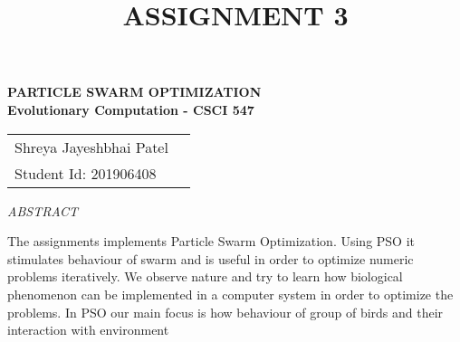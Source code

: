 \documentclass{article}
\title{ASSIGNMENT 3}
\begin{document}
\maketitle
\begin{center}
\Large \textbf{PARTICLE SWARM OPTIMIZATION}
\\[5pt]
\centering
\small {\bf Evolutionary Computation - CSCI 547}
\\[6pt]
\begin{table}[h]
\centering
\begin{tabular}{lr}
Shreya Jayeshbhai Patel
\\[0.75pt]
Student Id: 201906408

\end{tabular}
\end{table}
\end{center}

\renewcommand\thepage{} %
\newpage

\begin{center}

\begin{center}
\emph{\LARGE ABSTRACT}\\[1cm]
    
\end{center}
\begin{center}
\begin{minipage}{33em}
\noindent
The assignments implements Particle Swarm Optimization. 
Using PSO it stimulates behaviour of swarm and is useful 
in order to optimize numeric problems iteratively. We 
observe nature and try to learn how biological phenomenon 
can be implemented in a computer system in order 
to optimize the problems. In PSO our main focus is how 
behaviour of group of birds and their interaction with environment

\end{minipage}
\end{center}







\end{center}
\end{document}
